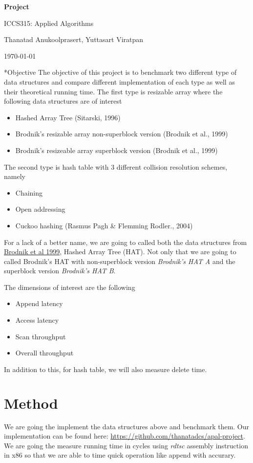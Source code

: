 \documentclass{article} %
\newcommand{\question}[2][]{\begin{flushleft}
                                \textbf{Question #1}: \textit{#2}

\end{flushleft}}
\newcommand{\maketitletwo}[2][]{\begin{center}
        \Large{\textbf{Project #1}
            
            ICCS315: Applied Algorithms} %
        \vspace{5pt}
        
        \normalsize{Thanatad Anukoolprasert, Yuttasart Viratpan   %
        
        \today}        %
        \vspace{15pt}
\end{center}}
\begin{document}
    \maketitletwo[]  %

    \section*{Objective}
    The objective of this project is to benchmark two different type of data structures and compare different
    implementation of each type as well as their theoretical running time.
    The first type is resizable array where the following data structures are of interest
    \begin{itemize}
        \item Hashed Array Tree (Sitarski, 1996)
        \item Brodnik's resizable array non-superblock version (Brodnik et al., 1999)
        \item Brodnik's resizeable array superblock version (Brodnik et al., 1999)
    \end{itemize}
    The second type is hash table with 3 different collision resolution schemes, namely
    \begin{itemize}
        \item Chaining
        \item Open addressing
        \item Cuckoo hashing (Rasmus Pagh \& Flemming Rodler., 2004)
    \end{itemize}

    For a lack of a better name, we are going to called both the data structures from \href{ https://sedgewick.io/wp-content/themes/sedgewick/papers/1999Optimal.pdf}{ Brodnik et al 1999}, Hashed Array Tree (HAT).
    Not only that we are going to called Brodnik's HAT with non-superblock version \emph{Brodnik's HAT A} and the superblock version \emph{Brodnik's HAT B}.

    The dimensions of interest are the following
    \begin{itemize}
        \item Append latency
        \item Access latency
        \item Scan throughput
        \item Overall throughput
    \end{itemize}
    In addition to this, for hash table, we will also measure delete time.
    \section*{Method}
    We are going the implement the data structures above and benchmark them. Our implementation can be found here: \href{https://github.com/thanatadcs/apal-project}{ https://github.com/thanatadcs/apal-project}.
    We are going the measure running time in cycles using
    \emph{rdtsc} assembly instruction in x86 so that we are able to time quick operation like append with accurary.
\end{document}
